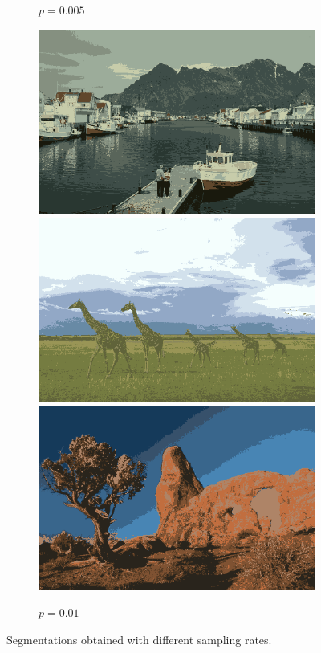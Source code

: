 \documentclass[11pt,a4paper]{article}
\begin{document}
\begin{figure}
\begin{subfigure}[b]{0.24\textwidth}
        \caption{$p=0.005$}
    \end{subfigure}
    \begin{subfigure}[b]{0.24\textwidth}
        \centering
        \includegraphics[width=\textwidth]{figures/sampling_rate/0.01/219090_avg.png}
        \includegraphics[width=\textwidth]{figures/sampling_rate/0.01/253055_avg.png}
        \includegraphics[width=\textwidth]{figures/sampling_rate/0.01/295087_avg.png}
        \caption{$p=0.01$}
    \end{subfigure}
       \caption{Segmentations obtained with different sampling rates.}
       \label{fig:sampling-rate}
\end{figure}
\end{document}
